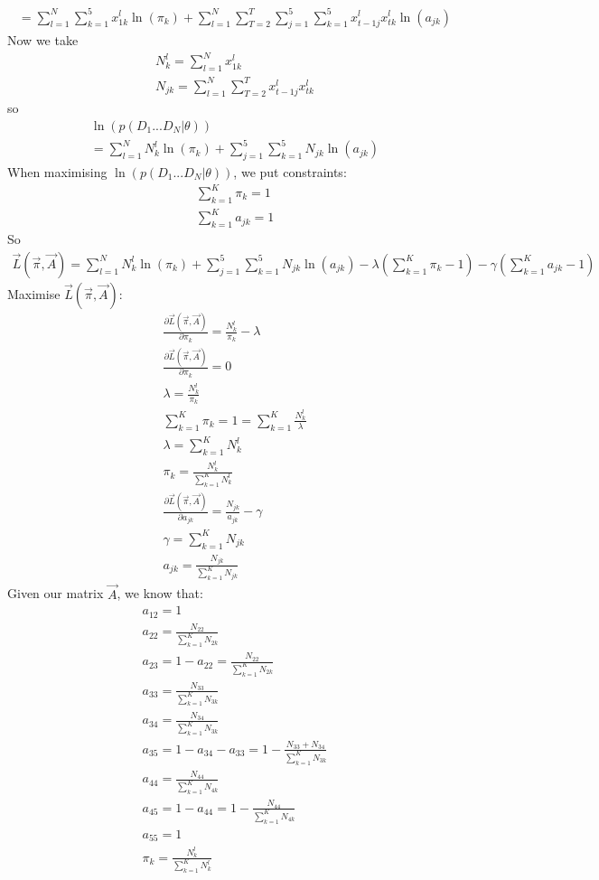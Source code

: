 \documentclass[12pt,twoside]{article}
\begin{document}
\begin{enumerate}[(i)]
\begin{align}
= \sum_{l=1}^{N} \sum_{k=1}^5 x_{1k}^l \ln(\pi_k) +  \sum_{l=1}^{N} \sum_{T=2}^T \sum_{j=1}^5 \sum_{k=1}^5 x_{t-1j}^l x_{tk}^l \ln(a_{jk})
\end{align}
Now we take
\begin{align}
N_k^l = \sum_{l=1}^N x_{1k}^l \\
N_{jk} = \sum_{l=1}^N \sum_{T=2}^T x_{t-1j}^l x_{tk}^l  
\end{align}
so
\begin{align}
\ln(p(D_1 ... D_N | \theta)) \\
= \sum_{l=1}^{N}N_k^l \ln (\pi_k) +  \sum_{j=1}^5 \sum_{k=1}^5  N_{jk} \ln( a_{jk} )
\end{align}
When maximising $\ln(p(D_1 ... D_N | \theta)) $, we put constraints:
\begin{align}
\sum_{k=1}^{K}\pi_k = 1\\
\sum_{k=1}^{K} a_{jk} = 1
\end{align}
So
\begin{align}
\vec{L}(\vec{\pi}, \vec{A}) = \sum_{l=1}^{N}N_k^l \ln (\pi_k) +  \sum_{j=1}^5 \sum_{k=1}^5  N_{jk} \ln (a_{jk}) - \lambda (\sum_{k=1}^{K}\pi_k - 1) - \gamma (\sum_{k=1}^{K} a_{jk} -1 )
\end{align}
Maximise $\vec{L}(\vec{\pi}, \vec{A})$:
\begin{align}
 \frac{\partial \vec{L}(\vec{\pi}, \vec{A})}{\partial \pi_k} = \frac{N_k^l}{\pi_k} - \lambda  \\
\frac{\partial  \vec{L}(\vec{\pi}, \vec{A})}{\partial \pi_k} = 0 \\
\lambda = \frac{N_k^l}{\pi_k} \\
\sum_{k=1}^{K}\pi_k = 1 = \sum_{k=1}^{K} \frac{N_k^l}{\lambda}\\
\lambda = \sum_{k=1}^{K} N_k^l\\
\pi_k = \frac{N_k^l}{\sum_{k=1}^{K} N_k^l} \\
\frac{\partial \vec{L}(\vec{\pi}, \vec{A})}{\partial a_{jk}} = \frac{N_{jk} }{a_{jk}} - \gamma \\
\gamma =  \sum_{k=1}^{K} N_{jk} \\
a_{jk} = \frac{N_{jk}}{\sum_{k=1}^{K} N_{jk}} 
\end{align}
Given our matrix $\vec{A}$, we know that:
\begin{align}
a_{12} = 1 \\
a_{22} = \frac{N_{22}}{\sum_{k=1}^{K} N_{2k}} \\
a_{23} = 1-a_{22} = \frac{N_{22}}{\sum_{k=1}^{K} N_{2k}} \\
a_{33} =  \frac{N_{33}}{\sum_{k=1}^{K} N_{3k}} \\
a_{34} =  \frac{N_{34}}{\sum_{k=1}^{K} N_{3k}} \\
a_{35} = 1- a_{34} - a_{33} = 1- \frac{N_{33} + N_{34}}{\sum_{k=1}^{K} N_{3k}} \\
a_{44} =  \frac{N_{44}}{\sum_{k=1}^{K} N_{4k}} \\
a_{45} = 1- a_{44} = 1-  \frac{N_{44}}{\sum_{k=1}^{K} N_{4k}} \\
a_{55} = 1 \\
\pi_k = \frac{N_k^l}{\sum_{k=1}^{K} N_k^l} 
\end{align}



\end{enumerate}
\end{document}

